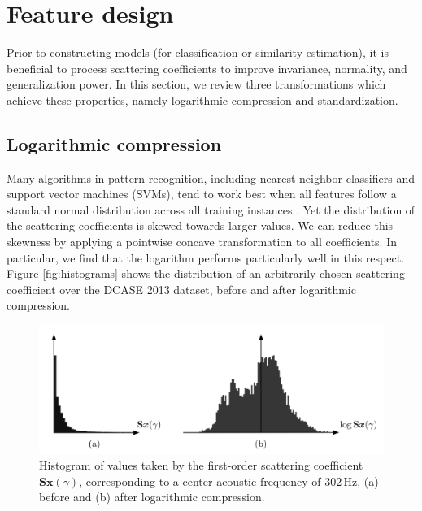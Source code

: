 \documentclass[journal]{IEEEtran}
\begin{document}
\section{Feature design}
\label{sec:design}

Prior to constructing models (for classification or similarity estimation), it is beneficial to process scattering coefficients to improve invariance, normality, and generalization power.
In this section, we review three transformations which achieve these properties, namely logarithmic compression and standardization.

\subsection{Logarithmic compression}
\label{sec:logcomp}

Many algorithms in pattern recognition, including nearest-neighbor classifiers and support vector machines (SVMs), tend to work best when all features follow a standard normal distribution across all training instances \cite{Hsu2003}.
Yet the distribution of the scattering coefficients is skewed towards larger values. We can reduce this skewness by applying a pointwise concave transformation to all coefficients. In particular, we find that the logarithm performs particularly well in this respect.
Figure \ref{fig:histograms} shows the distribution of an arbitrarily chosen scattering coefficient over the DCASE 2013 dataset, before and after logarithmic compression.

\begin{figure}
\begin{center}
\includegraphics[width=\columnwidth]{bw/compression}
\caption{
\label{fig:histograms}
Histogram of values taken by the first-order scattering coefficient $\mathbf{S}\boldsymbol{x}(\gamma)$, corresponding to a center acoustic frequency of $302\,\mathrm{Hz}$,
(a) before and (b) after logarithmic compression.}
\label{fig:compression}
\end{center}
\end{figure}
\end{document}

